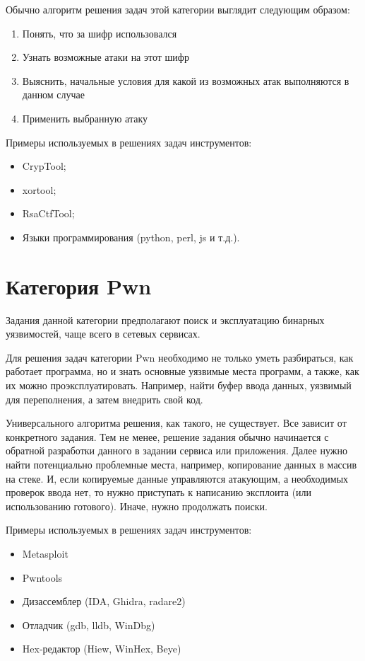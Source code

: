 Обычно алгоритм решения задач этой категории выглядит следующим образом:
\begin{enumerate}
    \item Понять, что за шифр использовался
    \item Узнать возможные атаки на этот шифр
    \item Выяснить, начальные условия для какой из возможных атак выполняются в данном случае
    \item Применить выбранную атаку
\end{enumerate}
Примеры используемых в решениях задач инструментов:
\begin{itemize}
    \item CrypTool;
    \item xortool;
    \item RsaCtfTool;
    \item Языки программирования (python, perl, js и т.д.).
\end{itemize}




\section{Категория Pwn}

Задания данной категории предполагают поиск и эксплуатацию бинарных уязвимостей, чаще всего в сетевых сервисах.

Для решения задач категории Pwn необходимо не только уметь разбираться, как работает программа, но и знать основные уязвимые места программ, а также, как их можно проэксплуатировать. Например, найти буфер ввода данных, уязвимый для переполнения, а затем внедрить свой код.

Универсального алгоритма решения, как такого, не существует. Все зависит от конкретного задания. Тем не менее, решение задания обычно начинается с обратной разработки данного в задании сервиса или приложения. Далее нужно найти потенциально проблемные места, например, копирование данных в массив на стеке. И, если копируемые данные управляются атакующим, а необходимых проверок ввода нет, то нужно приступать к написанию эксплоита (или использованию готового). Иначе, нужно продолжать поиски.

Примеры используемых в решениях задач инструментов:
\begin{itemize}
    \item Metasploit
    \item Pwntools
    \item Дизассемблер (IDA, Ghidra, radare2)
    \item Отладчик (gdb, lldb, WinDbg)
    \item Hex-редактор (Hiew, WinHex, Beye)
\end{itemize}

